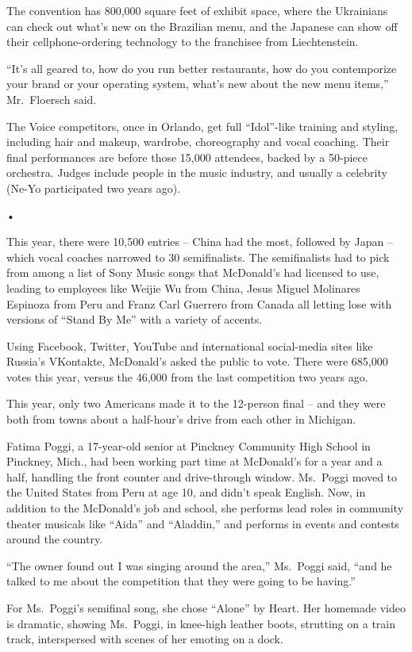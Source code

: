 ﻿\documentclass[12pt]{article}
\begin{document}
The convention has 800,000 square feet of exhibit space, where the Ukrainians can check out what's
new on the Brazilian menu, and the Japanese can show off their cellphone-ordering technology to the
franchisee from Liechtenstein.

``It's all geared to, how do you run better restaurants, how do you contemporize your brand or your
operating system, what's new about the new menu items,'' Mr.~Floersch said.

The Voice competitors, once in Orlando, get full ``Idol''-like training and styling, including hair
and makeup, wardrobe, choreography and vocal coaching. Their final performances are before those
15,000 attendees, backed by a 50-piece orchestra. Judges include people in the music industry, and
usually a celebrity (Ne-Yo participated two years ago).

•

This year, there were 10,500 entries -- China had the most, followed by Japan -- which vocal coaches
narrowed to 30 semifinalists. The semifinalists had to pick from among a list of Sony Music songs
that McDonald's had licensed to use, leading to employees like Weijie Wu from China, Jesus Miguel
Molinares Espinoza from Peru and Franz Carl Guerrero from Canada all letting lose with versions of
``Stand By Me'' with a variety of accents.

Using Facebook, Twitter, YouTube and international social-media sites like Russia's VKontakte,
McDonald's asked the public to vote. There were 685,000 votes this year, versus the 46,000 from the
last competition two years ago.

This year, only two Americans made it to the 12-person final -- and they were both from towns about
a half-hour's drive from each other in Michigan.

Fatima Poggi, a 17-year-old senior at Pinckney Community High School in Pinckney, Mich., had been
working part time at McDonald's for a year and a half, handling the front counter and drive-through
window. Ms.~Poggi moved to the United States from Peru at age 10, and didn't speak English. Now, in
addition to the McDonald's job and school, she performs lead roles in community theater musicals
like ``Aida'' and ``Aladdin,'' and performs in events and contests around the country.

``The owner found out I was singing around the area,'' Ms.~Poggi said, ``and he talked to me about
the competition that they were going to be having.''

For Ms.~Poggi's semifinal song, she chose ``Alone'' by Heart. Her homemade video is dramatic,
showing Ms.~Poggi, in knee-high leather boots, strutting on a train track, interspersed with scenes
of her emoting on a dock.
\end{document}
